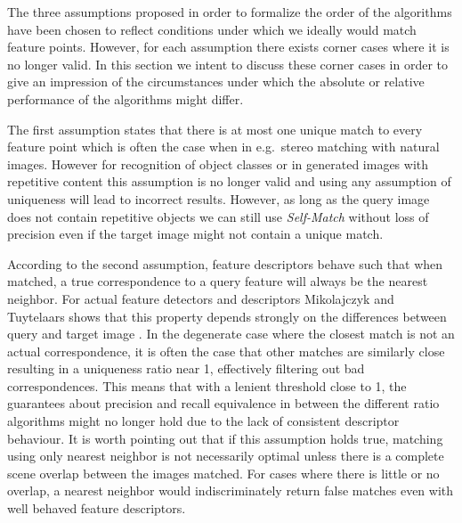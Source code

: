 \documentclass[journal]{IEEEtran}
\begin{document}

The three assumptions proposed in order to formalize the order of the 
algorithms have been chosen to reflect conditions under which we ideally
would match feature points. However, for each assumption there exists 
corner cases where it is no longer valid. In this section we intent to 
discuss these corner cases in order to give an impression of the 
circumstances under which the absolute or relative performance of the 
algorithms might differ.

The first assumption states that there is at most one unique match to 
every feature point which is often the case when in e.g.\ stereo 
matching with natural images. However for recognition of object classes 
or in generated images with repetitive content this assumption is no 
longer valid and using any assumption of uniqueness will lead to 
incorrect results. However, as long as the query image does not contain 
repetitive objects we can still use \emph{Self-Match} without loss of 
precision even if the target image might not contain a unique match.

According to the second assumption, feature descriptors behave such that
when matched, a true correspondence to a query feature will always be 
the nearest neighbor. For actual feature detectors and descriptors 
Mikolajczyk and Tuytelaars shows that this property depends strongly on 
the differences between query and target image 
\cite{mikolajczyk2005performance} \cite{tuytelaars2008local}. In the 
degenerate case where the closest match is not an actual correspondence, 
it is often the case that other matches are similarly close resulting in 
a uniqueness ratio near 1, effectively filtering out bad 
correspondences.  This means that with a lenient threshold close to 1, 
the guarantees about precision and recall equivalence in between the 
different ratio algorithms might no longer hold due to the lack of 
consistent descriptor behaviour. It is worth pointing out that if this 
assumption holds true, matching using only nearest neighbor is not 
necessarily optimal unless there is a complete scene overlap between
the images matched. For cases where there is little or no overlap, a 
nearest neighbor would indiscriminately return false matches even with 
well behaved feature descriptors.
\end{document}
